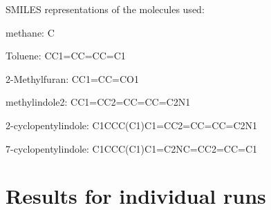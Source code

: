 SMILES representations of the molecules used:


methane: C

Toluene: CC1=CC=CC=C1

2-Methylfuran: CC1=CC=CO1

methylindole2: CC1=CC2=CC=CC=C2N1

2-cyclopentylindole: C1CCC(C1)C1=CC2=CC=CC=C2N1

7-cyclopentylindole: C1CCC(C1)C1=C2NC=CC2=CC=C1





\section{Results for individual runs}

\begin{figure}[htp] 
	\centering
	\hfil
	

\end{figure}
